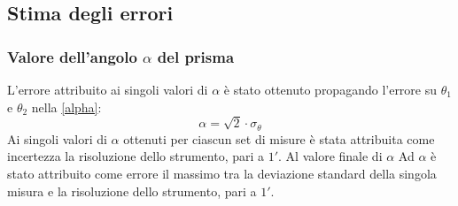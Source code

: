 \documentclass[]{article}
\let\oldsubsection\subsection%
\renewcommand{\subsection}{%
	\renewcommand{\theequation}{\thesubsection.\arabic{equation}}%
	\oldsubsection}%
\begin{document}
    \subsection{Stima degli errori}
    \subsubsection{Valore dell'angolo $\alpha$ del prisma}
    L'errore attribuito ai singoli valori di $\alpha$ è stato ottenuto propagando l'errore su $\theta_1$ e $\theta_2$ nella \ref{alpha}:
    \begin{equation}
        \label{alpha-err}
        \alpha = \sqrt{2} \cdot \sigma_{\theta} 
    \end{equation}
    Ai singoli valori di $\alpha$ ottenuti per ciascun set di misure è stata attribuita come incertezza 
     la risoluzione dello strumento, pari a $1'$. Al valore finale di $\alpha$
    Ad $\alpha$ è stato attribuito come errore il massimo tra la deviazione standard della singola misura e la risoluzione dello strumento, pari a $1'$.
    \label{par:alpha_err}
\end{document}
